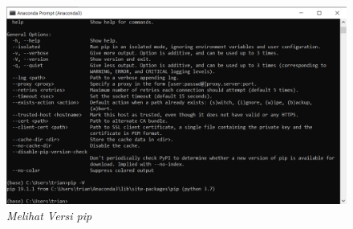 \begin{enumerate}
\begin{figure}[H]
    \centering
    \includegraphics[scale=0.5]{figures/pipversion}
    \caption{\textit{Melihat Versi pip}}
    \label{Figureanaconda70}
\end{figure}

\end{enumerate}

